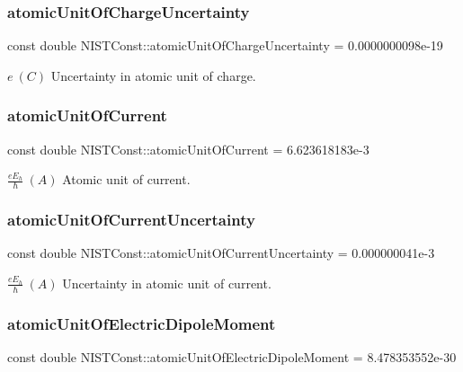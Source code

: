 \subsubsection{\texorpdfstring{atomic\+Unit\+Of\+Charge\+Uncertainty}{atomicUnitOfChargeUncertainty}}
{\footnotesize\ttfamily const double N\+I\+S\+T\+Const\+::atomic\+Unit\+Of\+Charge\+Uncertainty = 0.\+0000000098e-\/19}

$e \ (C)$ Uncertainty in atomic unit of charge. \mbox{\label{group___atomic_unit_ga6d0f3cfc8aaa2aeb120559aaea2dc5c6}} 
\subsubsection{\texorpdfstring{atomic\+Unit\+Of\+Current}{atomicUnitOfCurrent}}
{\footnotesize\ttfamily const double N\+I\+S\+T\+Const\+::atomic\+Unit\+Of\+Current = 6.\+623618183e-\/3}

$\frac{e E_h}{\hbar} \ (A)$ Atomic unit of current. \mbox{\label{group___atomic_unit_gaef0b7cef2d2f63889e17b26d37173d3d}} 
\subsubsection{\texorpdfstring{atomic\+Unit\+Of\+Current\+Uncertainty}{atomicUnitOfCurrentUncertainty}}
{\footnotesize\ttfamily const double N\+I\+S\+T\+Const\+::atomic\+Unit\+Of\+Current\+Uncertainty = 0.\+000000041e-\/3}

$ \frac{e E_h}{\hbar} \ (A)$ Uncertainty in atomic unit of current. \mbox{\label{group___atomic_unit_ga108a8be4e32eddd7cdfdf4473f3532ab}} 
\subsubsection{\texorpdfstring{atomic\+Unit\+Of\+Electric\+Dipole\+Moment}{atomicUnitOfElectricDipoleMoment}}
{\footnotesize\ttfamily const double N\+I\+S\+T\+Const\+::atomic\+Unit\+Of\+Electric\+Dipole\+Moment = 8.\+478353552e-\/30}

